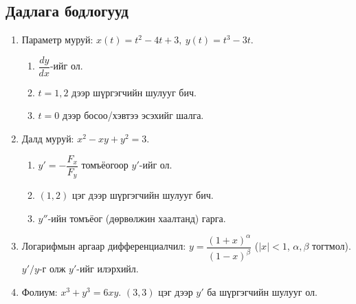 \subsection{Дадлага бодлогууд}
\begin{enumerate}
    \item 
Параметр муруй: $x(t)=t^2-4t+3,\ y(t)=t^3-3t$. 
\begin{enumerate}
  \item $\dfrac{dy}{dx}$-ийг ол.
  \item $t=1,2$ дээр шүргэгчийн шулууг бич.
  \item $t=0$ дээр босоо/хэвтээ эсэхийг шалга.
\end{enumerate}
\item Далд муруй: $x^2-xy+y^2=3$.
\begin{enumerate}
  \item $y'=-\dfrac{F_x}{F_y}$ томъёогоор $y'$-ийг ол.
  \item $(1,2)$ цэг дээр шүргэгчийн шулууг бич.
  \item $y''$-ийн томъёог (дөрвөлжин хаалтанд) гарга.
\end{enumerate}
\item Логарифмын аргаар дифференциалчил: $y=\dfrac{(1+x)^{\alpha}}{(1-x)^{\beta}}$ \;($|x|<1$,\; $\alpha,\beta$ тогтмол). $y'/y$-г олж $y'$-ийг илэрхийл.
\item Фолиум: $x^3+y^3=6xy$. $(3,3)$ цэг дээр $y'$ ба шүргэгчийн шулууг ол.
\end{enumerate}
\newpage
